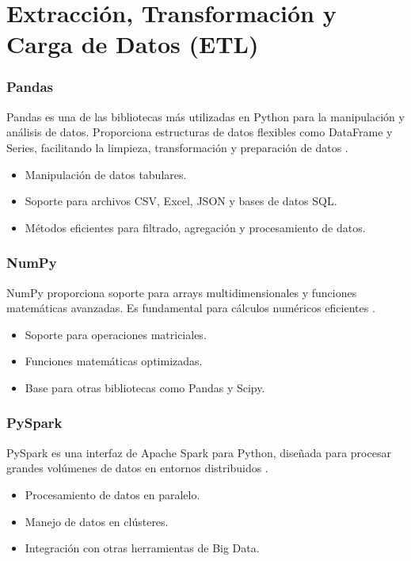 \section{Extracción, Transformación y Carga de Datos (ETL)}

\subsubsection{Pandas}
Pandas es una de las bibliotecas más utilizadas en Python para la manipulación y análisis de datos. Proporciona estructuras de datos flexibles como DataFrame y Series, facilitando la limpieza, transformación y preparación de datos \cite{mckinney2010pandas}.

\begin{itemize}
	\item Manipulación de datos tabulares.
	\item Soporte para archivos CSV, Excel, JSON y bases de datos SQL.
	\item Métodos eficientes para filtrado, agregación y procesamiento de datos.
\end{itemize}

\subsubsection{NumPy}
NumPy proporciona soporte para arrays multidimensionales y funciones matemáticas avanzadas. Es fundamental para cálculos numéricos eficientes \cite{harris2020array}.

\begin{itemize}
	\item Soporte para operaciones matriciales.
	\item Funciones matemáticas optimizadas.
	\item Base para otras bibliotecas como Pandas y Scipy.
\end{itemize}

\subsubsection{PySpark}
PySpark es una interfaz de Apache Spark para Python, diseñada para procesar grandes volúmenes de datos en entornos distribuidos \cite{zaharia2016apachespark}.

\begin{itemize}
	\item Procesamiento de datos en paralelo.
	\item Manejo de datos en clústeres.
	\item Integración con otras herramientas de Big Data.
\end{itemize}

